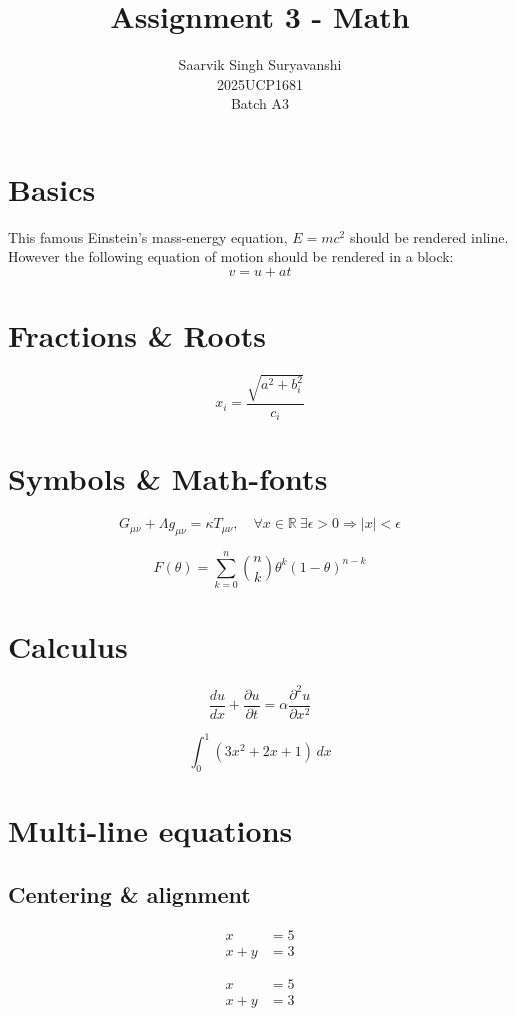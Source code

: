 \documentclass[12pt,a4paper]{article}
\title{Assignment 3 - Math}
\author{Saarvik Singh Suryavanshi\\2025UCP1681\\Batch A3}
\date{}
\begin{document}
\maketitle

\section{Basics}

This famous Einstein's mass-energy equation, \(E=mc^2\) should be rendered inline. However the following equation of motion should be rendered in a block:
\[
v=u+at
\]

\section{Fractions \& Roots}

\[
x_i=\frac{\sqrt{a^2+b_i^2}}{c_i}
\]

\section{Symbols \& Math-fonts}

\[
G_{\mu\nu}+\Lambda g_{\mu\nu}=\kappa T_{\mu\nu},\quad
\forall x\in\mathbb{R}\ \exists\epsilon>0\Rightarrow |x|<\epsilon
\]

\[
F(\theta)=\sum_{k=0}^{n}\binom{n}{k}\theta^k(1-\theta)^{n-k}
\]

\section{Calculus}

\[
\frac{du}{dx}+\frac{\partial u}{\partial t}
=\alpha\frac{\partial^2u}{\partial x^2}
\]

\[
\int_0^1(3x^2+2x+1)\,dx
\]

\section{Multi-line equations}

\subsection{Centering \& alignment}

\begin{align}
x&=5\\
x+y&=3
\end{align}

\begin{align}
x&=5\\
x+y&=3
\end{align}
\end{document}
